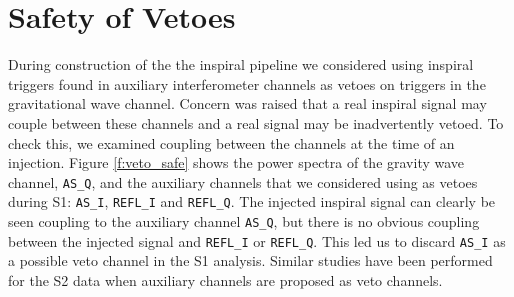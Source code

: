 \section{Safety of Vetoes}
\label{s:safety}

During construction of the the inspiral pipeline we considered using inspiral
triggers found in auxiliary interferometer channels as vetoes on triggers in
the gravitational wave channel. Concern was raised that a real inspiral signal
may couple between these channels and a real signal may be inadvertently
vetoed.  To check this, we examined coupling between the channels at the time
of an injection.  Figure \ref{f:veto_safe} shows the power spectra of the
gravity wave channel, \texttt{AS\_Q}, and the auxiliary channels that we
considered using as vetoes during S1: \texttt{AS\_I}, \texttt{REFL\_I} and
\texttt{REFL\_Q}.  The injected inspiral signal can clearly be seen coupling
to the auxiliary channel \texttt{AS\_Q}, but there is no obvious coupling
between the injected signal and \texttt{REFL\_I} or \texttt{REFL\_Q}. This
led us to discard \texttt{AS\_I} as a possible veto channel in the S1
analysis. Similar studies have been performed for the S2 data when auxiliary
channels are proposed as veto channels.
